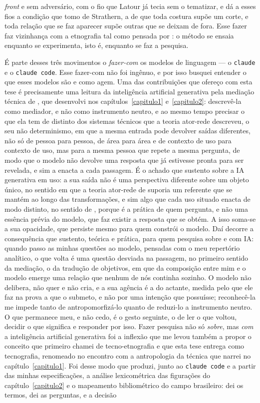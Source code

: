 \textit{front} e sem adversário, com o fio que Latour já tecia sem o tematizar, e dá a esses fios a condição que tomo de Strathern, a de que toda costura supõe um corte, e toda relação que se faz aparecer supõe outras que se deixam de fora. Esse fazer faz vizinhança com a etnografia tal como pensada por \textcite{Kofes2015Maconaria}: o método se ensaia enquanto se experimenta, isto é, enquanto se faz a pesquisa. 

É parte desses três movimentos o \textit{fazer-com} os modelos de linguagem --- o \texttt{claude} e o \texttt{claude code}. Esse fazer-com não foi ingênuo, e por isso busquei entender o que esses modelos são e como agem. Uma das contribuições que ofereço com esta tese é precisamente uma leitura da inteligência artificial generativa pela mediação técnica de \textcite{Latour2017Esperanca}, que desenvolvi nos capítulos~\ref{capitulo1} e~\ref{capitulo2}: descrevê-la como mediador, e não como instrumento neutro, e ao mesmo tempo precisar o que ela tem de distinto dos sistemas técnicos que a teoria ator-rede descreveu, o seu não determinismo, em que a mesma entrada pode devolver saídas diferentes, não só de pessoa para pessoa, de área para área e de contexto de uso para contexto de uso, mas para a mesma pessoa que repete a mesma pergunta, de modo que o modelo não devolve uma resposta que já estivesse pronta para ser revelada, e sim a enacta a cada passagem. É o achado que sustento sobre a IA generativa em uso: a sua saída não é uma perspectiva diferente sobre um objeto único, no sentido em que a teoria ator-rede de \textcite{Latour2017Esperanca} suporia um referente que se mantém ao longo das transformações, e sim algo que cada uso situado enacta de modo distinto, no sentido de \textcite{mol2002body}, porque é a prática de quem pergunta, e não uma essência prévia do modelo, que faz existir a resposta que se obtém. A isso soma-se a sua opacidade, que persiste mesmo para quem constrói o modelo. Daí decorre a consequência que sustento, teórica e prática, para quem pesquisa sobre e com IA: quando passo as minhas questões ao modelo, pensadas com o meu repertório analítico, o que volta é uma questão desviada na passagem, no primeiro sentido da mediação, o da tradução de objetivos, em que da composição entre mim e o modelo emerge uma relação que nenhum de nós continha sozinho. O modelo não delibera, não quer e não cria, e a sua agência é a do actante, medida pelo que ele faz na prova a que o submeto, e não por uma intenção que possuísse; reconhecê-la me impede tanto de antropomorfizá-lo quanto de reduzi-lo a instrumento neutro. O que permanece meu, e não cedo, é o gesto seguinte, o de ler o que voltou, decidir o que significa e responder por isso. Fazer pesquisa não só \textit{sobre}, mas \textit{com} a inteligência artificial generativa foi a inflexão que me levou também a propor o conceito que primeiro chamei de tecno-etnografia e que esta tese entrega como tecnografia, renomeado no encontro com a antropologia da técnica que narrei no capítulo~\ref{capitulo1}. Foi desse modo que produzi, junto ao \texttt{claude code} e a partir das minhas especificações, a análise lexicométrica das figurações do capítulo~\ref{capitulo2} e o mapeamento bibliométrico do campo brasileiro: dei os termos, dei as perguntas, e a decisão 